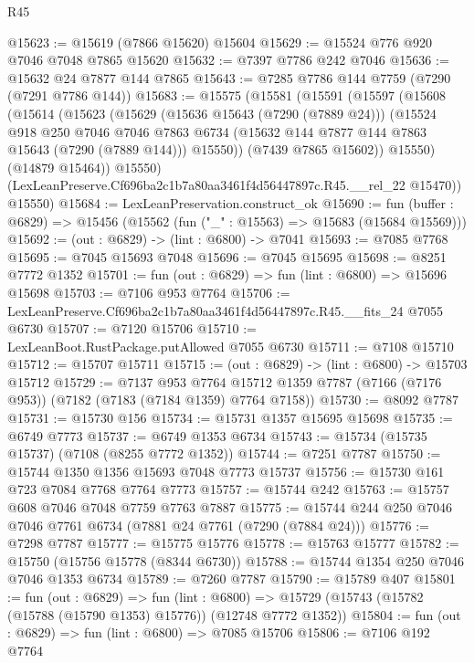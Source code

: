 \begin{lexlean}{R45}
\begin{coremodule}
{@15623 := @15619 (@7866 @15620) @15604
@15629 := @15524 @776 @920 @7046 @7048 @7865 @15620
@15632 := @7397 @7786 @242 @7046
@15636 := @15632 @24 @7877 @144 @7865
@15643 := @7285 @7786 @144 @7759 (@7290 (@7291 @7786 @144))
@15683 := @15575
    (@15581
      (@15591
        (@15597
          (@15608
            (@15614
              (@15623
                (@15629
                  (@15636 @15643 (@7290 (@7889 @24)))
                  (@15524
                    @918
                    @250
                    @7046
                    @7046
                    @7863
                    @6734
                    (@15632 @144 @7877 @144 @7863 @15643 (@7290 (@7889 @144)))
                    @15550))
                (@7439 @7865 @15602))
              @15550)
            (@14879 @15464))
          @15550)
        (LexLeanPreserve.Cf696ba2c1b7a80aa3461f4d56447897c.R45.__rel_22 @15470))
      @15550)
@15684 := LexLeanPreservation.construct_ok
@15690 := fun (buffer : @6829) => @15456 (@15562 (fun ("_" : @15563) => @15683 (@15684 @15569)))
@15692 := (out : @6829) -> (lint : @6800) -> @7041
@15693 := @7085 @7768
@15695 := @7045 @15693 @7048
@15696 := @7045 @15695
@15698 := @8251 @7772 @1352
@15701 := fun (out : @6829) => fun (lint : @6800) => @15696 @15698
@15703 := @7106 @953 @7764
@15706 := LexLeanPreserve.Cf696ba2c1b7a80aa3461f4d56447897c.R45.__fits_24 @7055 @6730
@15707 := @7120 @15706
@15710 := LexLeanBoot.RustPackage.putAllowed @7055 @6730
@15711 := @7108 @15710
@15712 := @15707 @15711
@15715 := (out : @6829) -> (lint : @6800) -> @15703 @15712
@15729 := @7137
    @953
    @7764
    @15712
    @1359
    @7787
    (@7166 (@7176 @953))
    (@7182 (@7183 (@7184 @1359) @7764 @7158))
@15730 := @8092 @7787
@15731 := @15730 @156
@15734 := @15731 @1357 @15695 @15698
@15735 := @6749 @7773
@15737 := @6749 @1353 @6734
@15743 := @15734 (@15735 @15737) (@7108 (@8255 @7772 @1352))
@15744 := @7251 @7787
@15750 := @15744 @1350 @1356 @15693 @7048 @7773 @15737
@15756 := @15730 @161 @723 @7084 @7768 @7764 @7773
@15757 := @15744 @242
@15763 := @15757 @608 @7046 @7048 @7759 @7763 @7887
@15775 := @15744 @244 @250 @7046 @7046 @7761 @6734 (@7881 @24 @7761 (@7290 (@7884 @24)))
@15776 := @7298 @7787
@15777 := @15775 @15776
@15778 := @15763 @15777
@15782 := @15750 (@15756 @15778 (@8344 @6730))
@15788 := @15744 @1354 @250 @7046 @7046 @1353 @6734
@15789 := @7260 @7787
@15790 := @15789 @407
@15801 := fun (out : @6829) =>
  fun (lint : @6800) => @15729 (@15743 (@15782 (@15788 (@15790 @1353) @15776)) (@12748 @7772 @1352))
@15804 := fun (out : @6829) => fun (lint : @6800) => @7085 @15706
@15806 := @7106 @192 @7764
}
\end{coremodule}
\end{lexlean}
